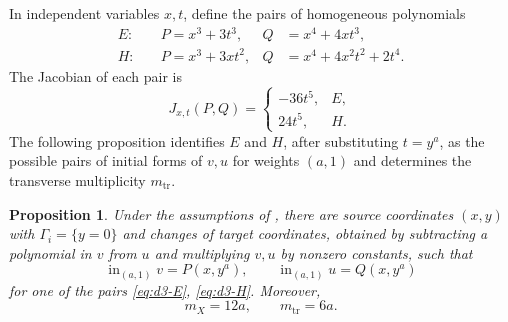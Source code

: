 \documentclass[11pt,letterpaper]{article}
\numberwithin{equation}{section}
\newtheorem{proposition}[proposition]{Proposition}
\theoremstyle{remark}
\theoremstyle{plain}
\begin{document}
In independent variables $x,t$, define the pairs of homogeneous polynomials
\begin{align}
 E:\quad &P=x^3+3t^3,& Q&=x^4+4xt^3,               \label{eq:d3-E}\\
 H:\quad &P=x^3+3xt^2,& Q&=x^4+4x^2t^2+2t^4.       \label{eq:d3-H}
\end{align}
The Jacobian of each pair is
\begin{equation}
 J_{x,t}(P,Q)=
 \begin{cases}-36t^5,&E,\\24t^5,&H.\end{cases}    \label{eq:d3-PQjac}
\end{equation}
The following proposition identifies $E$ and $H$, after substituting
$t=y^a$, as the possible pairs of initial forms of $v,u$ for weights
$(a,1)$ and determines the transverse multiplicity $m_{\mathrm{tr}}$.

\begin{proposition}
\label{prop:d3-models}
Under the assumptions of , there are source
coordinates $(x,y)$ with $\Gamma_i=\{y=0\}$ and
changes of target coordinates, obtained by subtracting a polynomial in
$v$ from $u$ and multiplying $v,u$ by nonzero constants, such that
\[
 \operatorname{in}_{(a,1)}v=P(x,y^a),\qquad
 \operatorname{in}_{(a,1)}u=Q(x,y^a)
\]
for one of the pairs \eqref{eq:d3-E}, \eqref{eq:d3-H}.  Moreover,
\begin{equation}
 m_X=12a,\qquad m_{\mathrm{tr}}=6a.                \label{eq:d3-exact}
\end{equation}
\end{proposition}
\end{document}
